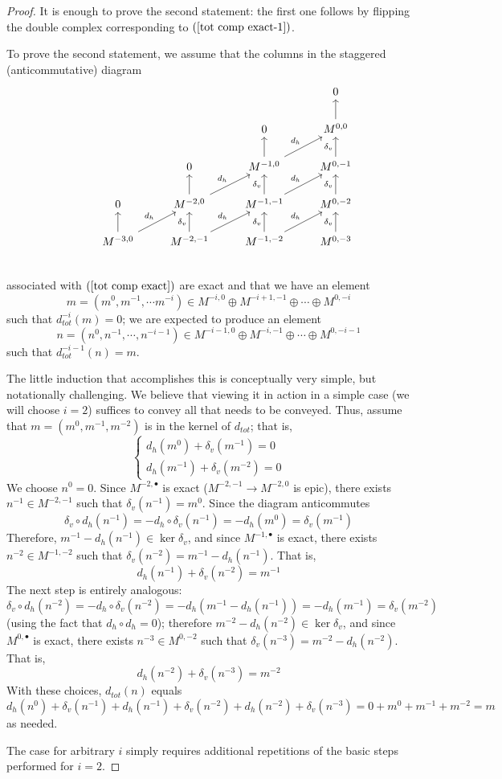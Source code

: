 \begin{proof}
It is enough to prove the second statement: the first one follows by flipping the double complex corresponding to $(\ref{tot comp exact-1})$.\par
To prove the second statement, we assume that the columns in the staggered
(anticommutative) diagram
\[\begin{tikzcd}
{}&{}&{}&{}&0\\
{}&{}&{}&0&M^{0,0}\ar[u]\\
{}&{}&0&M^{-1,0}\ar[ru,"d_h"]\ar[u]&M^{0,-1}\ar[u,"\delta_v"]\\
{}&0&M^{-2,0}\ar[ru,"d_h"]\ar[u]&M^{-1,-1}\ar[ru,"d_h"]\ar[u,"\delta_v"]&M^{0,-2}\ar[u,"\delta_v"]\\
{}&M^{-3,0}\ar[ru,"d_h"]\ar[u]&M^{-2,-1}\ar[ru,"d_h"]\ar[u,"\delta_v"]&M^{-1,-2}\ar[ru,"d_h"]\ar[u,"\delta_v"]&M^{0,-3}\ar[u,"\delta_v"]\\
\end{tikzcd}\]
associated with $(\ref{tot comp exact})$ are exact and that we have an element
\[m=(m^0,m^{-1},\cdots m^{-i})\in M^{-i,0}\oplus M^{-i+1,-1}\oplus\cdots\oplus M^{0,-i}\]
such that $d_{tot}^{-i}(m)=0$; we are expected to produce an element
\[n=(n^0,n^{-1},\cdots,n^{-i-1})\in M^{-i-1,0}\oplus M^{-i,-1}\oplus\cdots\oplus M^{0,-i-1}\]
such that $d^{-i-1}_{tot}(n)=m$.\par
The little induction that accomplishes this is conceptually very simple, but notationally challenging. We believe that viewing it in action in a simple case (we will choose $i=2$) suffices to convey all that needs to be conveyed. Thus, assume that $m=(m^0,m^{-1},m^{-2})$ is in the kernel of $d_{tot}$; that is,
\[\left\{
\begin{array}{l}
d_h(m^0)+\delta_v(m^{-1})=0\\
d_h(m^{-1})+\delta_v(m^{-2})=0
\end{array}\right. \]
We choose $n^0=0$. Since $M^{-2,\bullet}$ is exact ($M^{-2,-1}\to M^{-2,0}$ is epic), there exists $n^{-1}\in M^{-2,-1}$ such that $\delta_v(n^{-1})=m^0$. Since the diagram anticommutes
\[\delta_v\circ d_h(n^{-1})=-d_h\circ\delta_v(n^{-1})=-d_h(m^0)=\delta_v(m^{-1})\]
Therefore, $m^{-1}-d_h(n^{-1})\in\ker\delta_v$, and since $M^{-1,\bullet}$ is exact, there exists $n^{-2}\in M^{-1,-2}$ such that $\delta_v(n^{-2})=m^{-1}-d_h(n^{-1})$. That is,
\[d_h(n^{-1})+\delta_v(n^{-2})=m^{-1}\]
The next step is entirely analogous:
\[\delta_v\circ d_h(n^{-2})=-d_h\circ\delta_v(n^{-2})=-d_h(m^{-1}-d_h(n^{-1}))=-d_h(m^{-1})=\delta_v(m^{-2})\]
(using the fact that $d_h\circ d_h=0$); therefore $m^{-2}-d_h(n^{-2})\in\ker\delta_v$, and since $M^{0,\bullet}$ is exact, there exists $n^{-3}\in M^{0,-2}$ such that $\delta_v(n^{-3})=m^{-2}-d_h(n^{-2})$. That is,
\[d_h(n^{-2})+\delta_v(n^{-3})=m^{-2}\]
With these choices, $d_{tot}(n)$ equals
\[d_h(n^0)+\delta_v(n^{-1})+d_h(n^{-1})+\delta_v(n^{-2})+d_h(n^{-2})+\delta_v(n^{-3})=0+m^0+m^{-1}+m^{-2}=m\]
as needed.\par
The case for arbitrary $i$ simply requires additional repetitions of the basic steps performed for $i=2$.
\end{proof}
